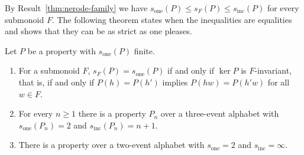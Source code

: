 By Result~\ref{thm:nerode-family} we have $s_{\mathrm{one}}(P)\le s_F(P)\le s_{\mathrm{inc}}(P)$ for every submonoid $F$. The following theorem states when the inequalities are equalities and shows that they can be as strict as one pleases.

\begin{newresult}\label{thm:gap}
Let $P$ be a property with $s_{\mathrm{one}}(P)$ finite.
\begin{enumerate}[nosep,label=(\alph*)]
  \item For a submonoid $F$, $s_F(P)=s_{\mathrm{one}}(P)$ if and only if $\ker P$ is $F$-invariant, that is, if and only if $P(h)=P(h')$ implies $P(hw)=P(h'w)$ for all $w\in F$.
  \item For every $n\ge1$ there is a property $P_n$ over a three-event alphabet with $s_{\mathrm{one}}(P_n)=2$ and $s_{\mathrm{inc}}(P_n)=n+1$.
  \item There is a property over a two-event alphabet with $s_{\mathrm{one}}=2$ and $s_{\mathrm{inc}}=\infty$.
\end{enumerate}
\end{newresult}
